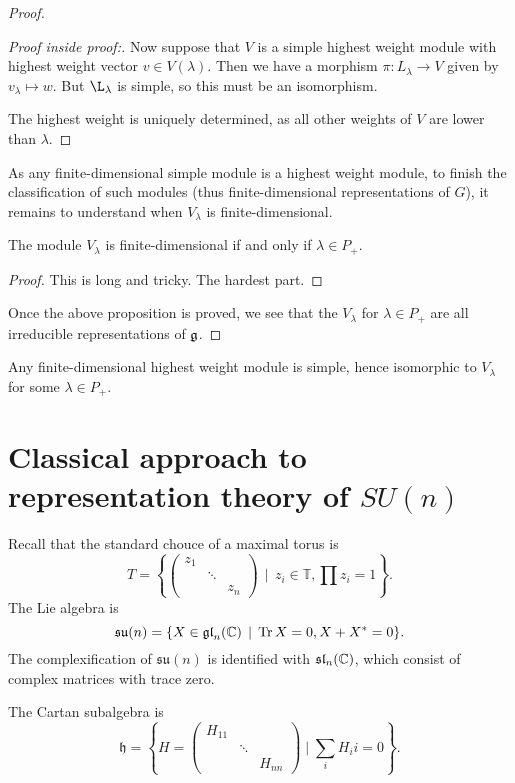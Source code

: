 \documentclass[11pt, english]{article}
\begin{document}
\begin{proof}
\begin{proof}[Proof inside proof:]
Now suppose that $V$ is a simple highest weight module with highest weight vector $v \in V(\lambda)$. Then we have a morphism $\pi:L_\lambda \to V$ given by $v_\lambda \mapsto w$. But $\L_\lambda$ is simple, so this must be an isomorphism.

The highest weight is uniquely determined, as all other weights of $V$ are lower than $\lambda$.
\end{proof}

As any finite-dimensional simple module is a highest weight module, to finish the classification of such modules (thus finite-dimensional representations of $G$), it remains to understand when $V_\lambda$ is finite-dimensional.

\begin{prop}
 The module $V_\lambda$ is finite-dimensional if and only if $\lambda \in P_+$. 
\end{prop}
\begin{proof}
  This is long and tricky. The hardest part.
\end{proof}
Once the above proposition is proved, we see that the $V_\lambda$ for $\lambda \in P_+$ are all irreducible representations of $\mathfrak g$.
\end{proof}

\begin{prop}
Any finite-dimensional highest weight module is simple,  hence isomorphic to $V_\lambda$ for some $\lambda \in P_+$. 
\end{prop}



\newpage
\section{Classical approach to representation theory of $SU(n)$}

Recall that the standard chouce of a maximal torus is 
$$
T = \left\{
  \begin{pmatrix}
    z_1 &  & \\
& \ddots & \\
&& z_n 
  \end{pmatrix} \, \mid \, z_i \in \mathbb T, \prod z_i = 1 \right\}.
$$
The Lie algebra is
$$
\mathfrak{su}(n) = \{ X \in \mathfrak{gl}_n(\mathbb{C}) \, \mid \, \operatorname{Tr} X = 0, X+X^\ast = 0 \}.
$$
The complexification of $\mathfrak{su}(n)$ is identified with $\mathfrak{sl}_n(\mathbb{C})$, which consist of complex matrices with trace zero.

The Cartan subalgebra is 
$$
\mathfrak h = \left\{
H =   \begin{pmatrix}
    H_{11} & & \\
& \ddots & \\
&& H_{nn} 
  \end{pmatrix} \mid \sum_i H_ii = 0 \right\}.
$$
\end{document}
